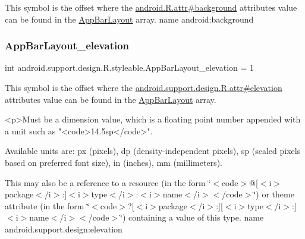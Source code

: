 This symbol is the offset where the \hyperlink{}{android.\+R.\+attr\#background} attribute\textquotesingle{}s value can be found in the \hyperlink{classandroid_1_1support_1_1design_1_1R_1_1styleable_ad4af8881949a584d986f4bfadb3e8482}{App\+Bar\+Layout} array.  name android\+:background \mbox{\label{classandroid_1_1support_1_1design_1_1R_1_1styleable_a46ec88e27c8abc55f395a719f90aa284}} 
\subsubsection{\texorpdfstring{App\+Bar\+Layout\+\_\+elevation}{AppBarLayout\_elevation}}
{\footnotesize\ttfamily int android.\+support.\+design.\+R.\+styleable.\+App\+Bar\+Layout\+\_\+elevation = 1\hspace{0.3cm}{\ttfamily [static]}}

This symbol is the offset where the \hyperlink{classandroid_1_1support_1_1design_1_1R_1_1attr_a5089b576eabe15b5d530b536c68a760d}{android.\+support.\+design.\+R.\+attr\#elevation} attribute\textquotesingle{}s value can be found in the \hyperlink{classandroid_1_1support_1_1design_1_1R_1_1styleable_ad4af8881949a584d986f4bfadb3e8482}{App\+Bar\+Layout} array.

\begin{DoxyVerb}      <p>Must be a dimension value, which is a floating point number appended with a unit such as "<code>14.5sp</code>".
\end{DoxyVerb}
 Available units are\+: px (pixels), dp (density-\/independent pixels), sp (scaled pixels based on preferred font size), in (inches), mm (millimeters). 

This may also be a reference to a resource (in the form \char`\"{}$<$code$>$@\mbox{[}$<$i$>$package$<$/i$>$\+:\mbox{]}$<$i$>$type$<$/i$>$\+:$<$i$>$name$<$/i$>$$<$/code$>$\char`\"{}) or theme attribute (in the form \char`\"{}$<$code$>$?\mbox{[}$<$i$>$package$<$/i$>$\+:\mbox{]}\mbox{[}$<$i$>$type$<$/i$>$\+:\mbox{]}$<$i$>$name$<$/i$>$$<$/code$>$\char`\"{}) containing a value of this type.  name android.\+support.\+design\+:elevation \mbox{\label{classandroid_1_1support_1_1design_1_1R_1_1styleable_a2a5c8e6f3224750307ec9d99f8d5b551}} 
